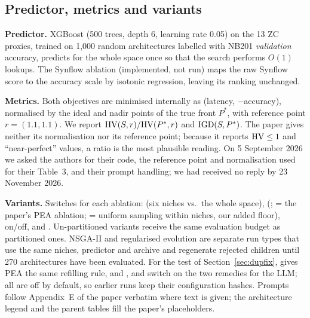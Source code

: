 \subsection{Predictor, metrics and variants}
\textbf{Predictor.} XGBoost (500 trees, depth 6, learning rate 0.05) on the 13 ZC proxies, trained on 1{,}000 random architectures labelled with NB201 \emph{validation} accuracy, predicts for the whole space once so that the search performs $O(1)$ lookups. The Synflow ablation (implemented, not run) maps the raw Synflow score to the accuracy scale by isotonic regression, leaving its ranking unchanged.

\noindent\textbf{Metrics.} Both objectives are minimised internally as (latency, $-$accuracy), normalised by the ideal and nadir points of the true front $P^\ast$, with reference point $r=(1.1,1.1)$. We report $\mathrm{HV}(S,r)/\mathrm{HV}(P^\ast,r)$ and $\mathrm{IGD}(S,P^\ast)$. The paper gives neither its normalisation nor its reference point; because it reports $\mathrm{HV}\le1$ and ``near-perfect'' values, a ratio is the most plausible reading. On 5 September 2026 we asked the authors for their code, the reference point and normalisation used for their Table~3, and their prompt handling; we had received no reply by 23 November 2026.

\noindent\textbf{Variants.} Switches for each ablation:  (six niches vs.\ the whole space),  (;  = the paper's PEA ablation;  = uniform sampling within niches, our added floor),  on/off, and . Un-partitioned variants receive the same evaluation budget as partitioned ones. NSGA-II and regularised evolution are separate run types that use the same niches, predictor and archive and regenerate rejected children until 270 architectures have been evaluated. For the test of Section~\ref{sec:dupfix},  gives PEA the same refilling rule, and ,  and  switch on the two remedies for the LLM; all are off by default, so earlier runs keep their configuration hashes. Prompts follow Appendix~E of the paper verbatim where text is given; the architecture legend and the parent tables fill the paper's placeholders.


